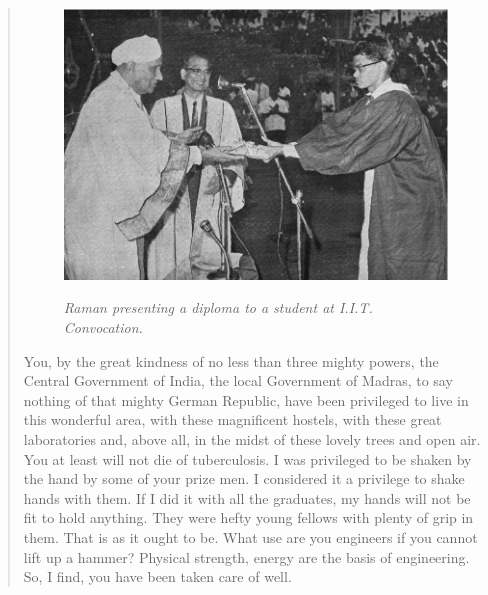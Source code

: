 \begin{quote}
{\begin{figure}[t]
\centering
\includegraphics{eps/15.eps}

{\fontsize{10pt}{12pt}\selectfont\em Raman presenting a diploma to a student at I.I.T. Convocation.}\relax
\end{figure}

You, by the great kindness of no less than three mighty powers, the Central Government of India, the local Government of Madras, to say nothing of that mighty German Republic, have been privileged to live in this wonderful area, with these magnificent hostels, with these great laboratories and, above all, in the midst of these lovely trees and open air. You at least will not die of tuberculosis. I was privileged to be shaken by the hand by some of your prize men. I considered it a privilege to shake hands with them. If I did it with all the graduates, my hands will not be fit to hold anything. They were hefty young fellows with plenty of grip in them. That is as it ought to be. What use are you engineers if you cannot lift up a hammer? Physical strength, energy are the basis of engineering. So, I find, you have been taken care of well.}\relax
\end{quote}

